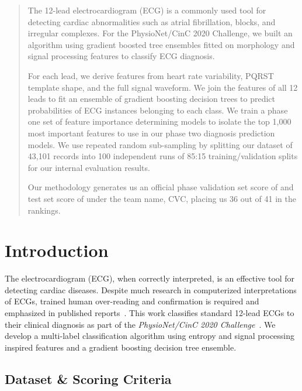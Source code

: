 \documentclass[\main/thesis.tex]{subfiles}
\begin{document}
\begin{abstract}

The 12-lead electrocardiogram (ECG) is a commonly used tool for detecting cardiac abnormalities such as atrial fibrillation, blocks, and irregular complexes.
For the PhysioNet/CinC 2020 Challenge, we built an algorithm using gradient boosted tree ensembles fitted on morphology and signal processing features to classify ECG diagnosis.

For each lead, we derive features from heart rate variability, PQRST template shape, and the full signal waveform.
We join the features of all 12 leads to fit an ensemble of gradient boosting decision trees to predict probabilities of ECG instances belonging to each class.
We train a phase one set of feature importance determining models to isolate the top 1,000 most important features to use in our phase two diagnosis prediction models.
We use repeated random sub-sampling by splitting our dataset of 43,101 records into 100 independent runs of 85:15 training/validation splits for our internal evaluation results.

Our methodology generates us an official phase validation set score of \officialvalscore and test set score of \officialtestscore under the team name, CVC, placing us 36 out of 41 in the rankings.

\end{abstract}

\section{Introduction}

The electrocardiogram (ECG), when correctly interpreted, is an effective tool for detecting cardiac diseases.
Despite much research in computerized interpretations of ECGs, trained human over-reading and confirmation is required and emphasized in published reports~\cite{SMITH201988,MADIAS2018413}.
This work classifies standard 12-lead ECGs to their clinical diagnosis as part of the \emph{PhysioNet/CinC 2020 Challenge}~\cite{physionet_challenge_2020}.
We develop a multi-label classification algorithm using entropy and signal processing inspired features and a gradient boosting decision tree ensemble.

\subsection{Dataset \& Scoring Criteria}
\end{document}
